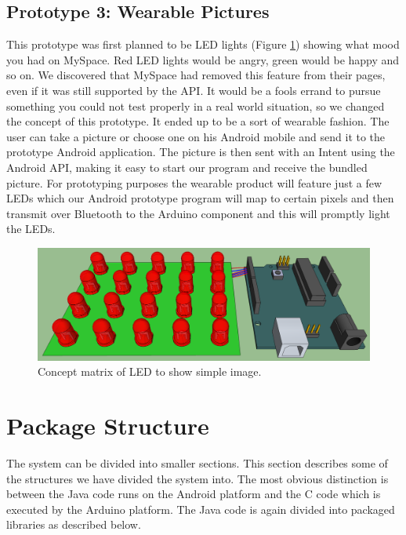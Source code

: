 	
\subsection{Prototype 3: Wearable Pictures}
This prototype was first planned to be LED lights (Figure \ref{fig:design-ledmatrix}) showing what mood you had on MySpace. Red LED lights would be angry,
green would be happy and so on. We discovered that MySpace had removed this feature from their pages, even if it was
still supported by the API. It would be a fools errand to pursue something you could not test properly
in a real world situation, so we changed the concept of this prototype. It ended up to be a sort of wearable fashion.
The user can take a picture or choose one on his Android mobile and send it to the prototype Android application.
The picture is then sent with an Intent using the Android API, making it easy to start our program and receive
the bundled picture. For prototyping purposes the wearable product will feature just a few LEDs which our Android
prototype program will map to certain pixels and then transmit over Bluetooth to the Arduino
component and this will promptly light the LEDs.

\begin{figure}
	\begin{center}
	\includegraphics[scale=0.35]{img/design-ledmatrix}
	\end{center}
	\caption{Concept matrix of LED to show simple image.}
	\label{fig:design-ledmatrix}
\end{figure}

\section{Package Structure}
The system can be divided into smaller sections. This section describes some of the structures
we have divided the system into. The most obvious distinction is between the Java code runs
on the Android platform and the C code which is executed by the Arduino platform.
The Java code is again divided into packaged libraries as described below.

